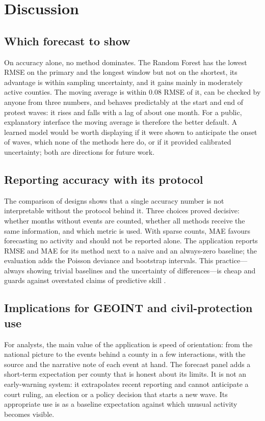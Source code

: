 \documentclass[11pt,a4paper]{article}
\begin{document}
\section{Discussion}
\label{sec:discussion}

\subsection{Which forecast to show}

On accuracy alone, no method dominates. The Random Forest has the lowest RMSE on the primary and the longest window but not on the shortest, its advantage is within sampling uncertainty, and it gains mainly in moderately active counties. The moving average is within 0.08 RMSE of it, can be checked by anyone from three numbers, and behaves predictably at the start and end of protest waves: it rises and falls with a lag of about one month. For a public, explanatory interface the moving average is therefore the better default. A learned model would be worth displaying if it were shown to anticipate the onset of waves, which none of the methods here do, or if it provided calibrated uncertainty; both are directions for future work.

\subsection{Reporting accuracy with its protocol}

The comparison of designs shows that a single accuracy number is not interpretable without the protocol behind it. Three choices proved decisive: whether months without events are counted, whether all methods receive the same information, and which metric is used. With sparse counts, MAE favours forecasting no activity and should not be reported alone. The application reports RMSE and MAE for its method next to a naive and an always-zero baseline; the evaluation adds the Poisson deviance and bootstrap intervals. This practice---always showing trivial baselines and the uncertainty of differences---is cheap and guards against overstated claims of predictive skill \cite{ward2010,hegre2022}.

\subsection{Implications for GEOINT and civil-protection use}

For analysts, the main value of the application is speed of orientation: from the national picture to the events behind a county in a few interactions, with the source and the narrative note of each event at hand. The forecast panel adds a short-term expectation per county that is honest about its limits. It is not an early-warning system: it extrapolates recent reporting and cannot anticipate a court ruling, an election or a policy decision that starts a new wave. Its appropriate use is as a baseline expectation against which unusual activity becomes visible.
\end{document}
